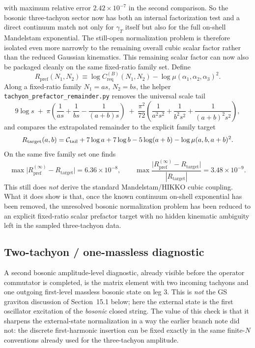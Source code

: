 \documentclass[11pt]{article}
\numberwithin{equation}{section}
\begin{document}
with maximum relative error $2.42\times 10^{-7}$ in the second comparison. So the bosonic three-tachyon sector now has both an internal factorization test and a direct continuum match not only for $\gamma_T$ itself but also for the full on-shell Mandelstam exponential. The still-open normalization problem is therefore isolated even more narrowly to the remaining overall cubic scalar factor rather than the reduced Gaussian kinematics.
This remaining scalar factor can now also be packaged cleanly on the same fixed-ratio family set. Define
\begin{equation}
\label{eq:s12-1-046c}
R_{\mathrm{pref}}(N_1,N_2)
\equiv
\log C_{\mathrm{req}}^{(B)}(N_1,N_2)-\log\mu(\alpha_1,\alpha_2,\alpha_3)^2.
\end{equation}
Along a fixed-ratio family $N_1=as$, $N_2=bs$, the helper
\texttt{tachyon\_prefactor\_remainder.py} removes the universal scale tail
\begin{equation}
\label{eq:s12-1-046d}
9\log s
\;+\;
\pi\!\left(\frac1{as}+\frac1{bs}-\frac1{(a+b)s}\right)
\;+\;
\frac{\pi^2}{72}
\!\left(\frac1{a^2s^2}+\frac1{b^2s^2}+\frac1{(a+b)^2s^2}\right),
\end{equation}
and compares the extrapolated remainder to the explicit family target
\begin{equation}
\label{eq:s12-1-046e}
R_{\mathrm{target}}(a,b)
=
{\cal C}_{\mathrm{tail}}
 + 7\log a + 7\log b - 5\log(a+b)
 - \log\mu(a,b,a+b)^2.
\end{equation}
On the same five family set one finds
\begin{equation}
\label{eq:s12-1-046f}
\max\bigl|R_{\mathrm{pref}}^{(\infty)}-R_{\mathrm{target}}\bigr|
=6.36\times 10^{-8},
\qquad
\max
\frac{\bigl|R_{\mathrm{pref}}^{(\infty)}-R_{\mathrm{target}}\bigr|}{|R_{\mathrm{target}}|}
=3.48\times 10^{-9}.
\end{equation}
This still does \emph{not} derive the standard Mandelstam/HIKKO cubic coupling.
What it does show is that, once the known continuum on-shell exponential has
been removed, the unresolved bosonic normalization problem has been reduced to
an explicit fixed-ratio scalar prefactor target with no hidden kinematic
ambiguity left in the sampled three-tachyon data.

\subsection{Two-tachyon / one-massless diagnostic}
A second bosonic amplitude-level diagnostic, already visible before the operator commutator is completed, is the matrix element with two incoming tachyons and one outgoing first-level massless bosonic state on leg $3$. This is \emph{not} the GS graviton discussion of Section~15.1 below; here the external state is the first oscillator excitation of the \emph{bosonic} closed string. The value of this check is that it sharpens the external-state normalization in a way the earlier branch note did not: the discrete first-harmonic insertion can be fixed exactly in the same finite-$N$ conventions already used for the three-tachyon amplitude.
\end{document}
